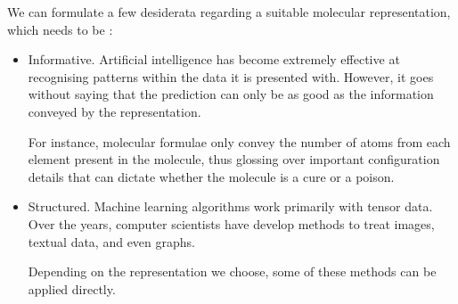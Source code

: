 \documentclass[11pt]{article}
\numberwithin{equation}{subsection}
\begin{document}
We can formulate a few desiderata regarding a suitable molecular representation, which needs to be :
\begin{itemize}
  \item Informative. Artificial intelligence has become extremely effective at recognising patterns within the data it is presented with. However, it goes without saying that the prediction can only be as good as the information conveyed by the representation.

  For instance, molecular formulae only convey the number of atoms from each element present in the molecule, thus glossing over important configuration details that can dictate whether the molecule is a cure or a poison.

  \item Structured. Machine learning algorithms work primarily with tensor data. Over the years, computer scientists have develop methods to treat images, textual data, and even graphs.

  Depending on the representation we choose, some of these methods can be applied directly.
\end{itemize}

%
%
\end{document}
